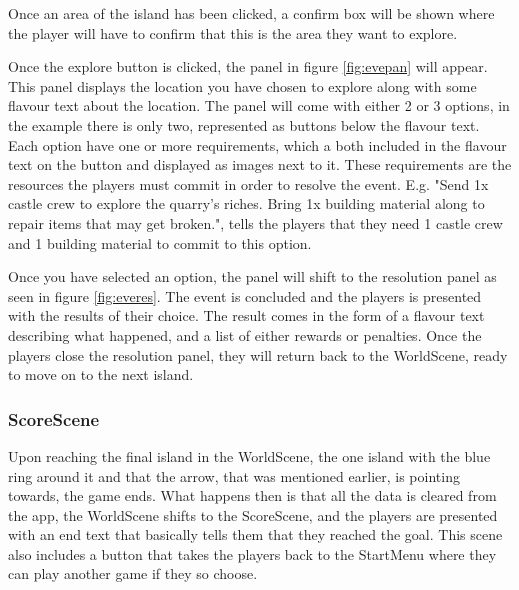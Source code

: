 Once an area of the island has been clicked, a confirm box will be shown where the player will have to confirm that this is the area they want to explore. 

Once the explore button is clicked, the panel in figure \ref{fig:evepan} will appear. 
This panel displays the location you have chosen to explore along with some flavour text about the location. 
The panel will come with either 2 or 3 options, in the example there is only two, represented as buttons below the flavour text. 
Each option have one or more requirements, which a both included in the flavour text on the button and displayed as images next to it. These requirements are the resources the players must commit in order to resolve the event. 
E.g. "Send 1x castle crew to explore the quarry's riches. Bring 1x building material along to repair items that may get broken.", tells the players that they need 1 castle crew and 1 building material to commit to this option.

Once you have selected an option, the panel will shift to the resolution panel as seen in figure \ref{fig:everes}. The event is concluded and the players is presented with the results of their choice. The result comes in the form of a flavour text describing what happened, and a list of either rewards or penalties.
Once the players close the resolution panel, they will return back to the WorldScene, ready to move on to the next island.

\subsubsection{ScoreScene}
Upon reaching the final island in the WorldScene, the one island with the blue ring around it and that the arrow, that was mentioned earlier, is pointing towards, the game ends. 
What happens then is that all the data is cleared from the app, the WorldScene shifts to the ScoreScene, and the players are presented with an end text that basically tells them that they reached the goal. This scene also includes a button that takes the players back to the StartMenu where they can play another game if they so choose.

